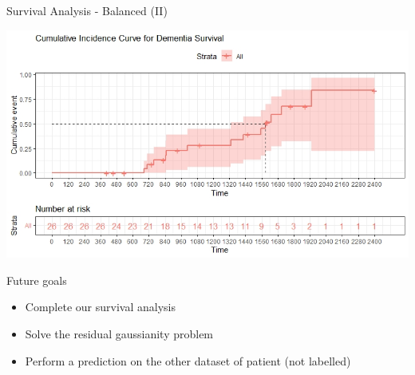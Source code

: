 \documentclass{beamer}
\begin{document}
	\begin{frame}{Survival Analysis - Balanced (II)}
	
		\begin{center}
			\includegraphics[width=\columnwidth]{cumulative_bilanciati.jpeg}
		\end{center}
	\end{frame}

	
	\begin{frame}{Future goals}
	
	\begin{itemize}
		\item Complete our survival analysis
		\item Solve the residual gaussianity problem
		\item Perform a prediction on the other dataset of patient (not labelled)
	\end{itemize}
		
	\end{frame}
	
	
\end{document}
